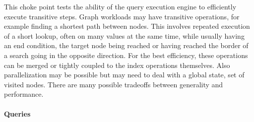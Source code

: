 
This choke point tests the ability of the query execution engine to efficiently execute transitive steps. Graph workloads may have transitive operations, for example finding a shortest path between nodes.
This involves repeated execution of a short lookup, often on many values at the
same time, while usually having an end condition, \eg the target node being reached or having reached the border of a search going in the opposite direction.
For the best efficiency, these operations can be merged or tightly coupled to
the index operations themselves. Also parallelization may be possible but may
need to deal with a global state, \eg set of visited nodes.
There are many possible tradeoffs between generality and performance.


\paragraph{Queries}
{\raggedright

}